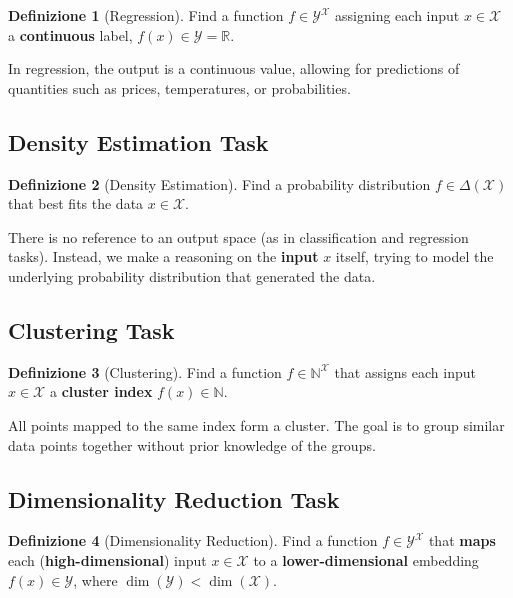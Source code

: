 \documentclass[11pt,a4paper]{article}
\theoremstyle{definition}
\newtheorem{definition}{Definizione}[section]
\theoremstyle{plain}
\theoremstyle{remark}
\begin{document}
\begin{definition}[Regression]
Find a function $f \in \mathcal{Y}^{\mathcal{X}}$ assigning each input $x \in \mathcal{X}$ a \textbf{continuous} label, $f(x) \in \mathcal{Y} = \mathbb{R}$.
\end{definition}

In regression, the output is a continuous value, allowing for predictions of quantities such as prices, temperatures, or probabilities.

\subsection{Density Estimation Task}

\begin{definition}[Density Estimation]
Find a probability distribution $f \in \Delta(\mathcal{X})$ that best fits the data $x \in \mathcal{X}$.
\end{definition}

There is no reference to an output space (as in classification and regression tasks). Instead, we make a reasoning on the \textbf{input} $x$ itself, trying to model the underlying probability distribution that generated the data.

\subsection{Clustering Task}

\begin{definition}[Clustering]
Find a function $f \in \mathbb{N}^{\mathcal{X}}$ that assigns each input $x \in \mathcal{X}$ a \textbf{cluster index} $f(x) \in \mathbb{N}$.
\end{definition}

All points mapped to the same index form a cluster. The goal is to group similar data points together without prior knowledge of the groups.

\subsection{Dimensionality Reduction Task}

\begin{definition}[Dimensionality Reduction]
Find a function $f \in \mathcal{Y}^{\mathcal{X}}$ that \textbf{maps} each (\textbf{high-dimensional}) input $x \in \mathcal{X}$ to a \textbf{lower-dimensional} embedding $f(x) \in \mathcal{Y}$, where $\dim(\mathcal{Y}) < \dim(\mathcal{X})$.
\end{definition}
\end{document}

